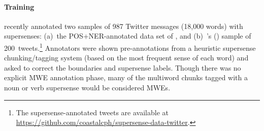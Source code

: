 \documentclass[11pt,letterpaper]{article}
\newcommand{\citeposs}[1]{\citeauthor{#1}'s (\citeyear{#1})}
\newcommand{\ensuretext}[1]{#1}
\newcommand{\nssmarker}{\ensuretext{\textcolor{magenta}{\ensuremath{^{\textsc{NS}}_{\textsc{S}}}}}}
\newcommand{\arkcomment}[3]{\ensuretext{\textcolor{#3}{[#1 #2]}}}
\newcommand{\nss}[1]{\arkcomment{\nssmarker}{#1}{magenta}}
\newcommand{\longversion}[1]{#1} %
\begin{document}
\paragraph{Training}
\citep{johannsen-14} recently annotated two samples of 987 Twitter messages (18,000 words) 
with supersenses\longversion{: 
(a)~the POS+NER-annotated data set of \citet{ritter-11}, 
and 
(b)~\citeposs{plank-14} sample of 200~tweets}.\footnote{The supersense-annotated tweets 
are available at \url{https://github.com/coastalcph/supersense-data-twitter}.}
Annotators were shown pre-annotations from a heuristic supersense chunking\slash tagging system%
\longversion{ (based on the most frequent sense of each word)}
and asked to correct the boundaries and supersense labels. 
Though there was no explicit MWE annotation phase, 
many of the multiword chunks tagged with a \longversion{noun or verb }supersense would be considered MWEs. 
\end{document}
